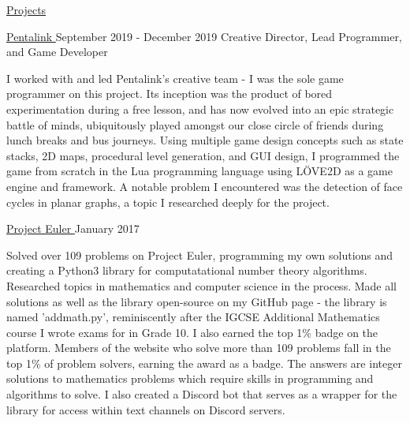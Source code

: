 \documentclass{resume} %
\begin{document}
\begin{rSection}{\href{ https://www.nitvishn.net/\#/projects }{Projects}}

    
        \begin{rSubsection}{ 
             \href{ https://pentalink.github.io/ }{ Pentalink } 
            }{ 
             September 2019 - December 2019 
             }{  Creative Director, Lead Programmer, and Game Developer  }
        \item I worked with and led Pentalink's creative team - I was the sole game programmer on this project. Its inception was the product of bored experimentation during a free lesson, and has now evolved into an epic strategic battle of minds, ubiquitously played amongst our close circle of friends during lunch breaks and bus journeys. Using multiple game design concepts such as state stacks, 2D maps, procedural level generation, and GUI design, I programmed the game from scratch in the Lua programming language using LÖVE2D as a game engine and framework. A notable problem I encountered was the detection of face cycles in planar graphs, a topic I researched deeply for the project.
        \end{rSubsection}
    

    
        \begin{rSubsection}{ 
             \href{ https://projecteuler.net/ }{ Project Euler } 
            }{ 
             January 2017 
             }{    }
        \item Solved over 109 problems on Project Euler, programming my own solutions and creating a Python3 library for computatational number theory algorithms. Researched topics in mathematics and computer science in the process. Made all solutions as well as the library open-source on my GitHub page - the library is named 'addmath.py', reminiscently after the IGCSE Additional Mathematics course I wrote exams for in Grade 10. I also earned the top 1\% badge on the platform. Members of the website who solve more than 109 problems fall in the top 1\% of problem solvers, earning the award as a badge. The answers are integer solutions to mathematics problems which require skills in programming and algorithms to solve. I also created a Discord bot that serves as a wrapper for the library for access within text channels on Discord servers.
        \end{rSubsection}
    


\end{rSection}
\end{document}
